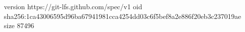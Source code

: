 version https://git-lfs.github.com/spec/v1
oid sha256:1ca43006595d96ba67941981cca4254dd03c6f5bef8a2e886f20eb3c237019ae
size 87496
